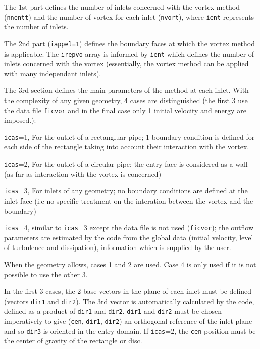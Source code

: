 {{{\begin{list}{-}{}
\item The 1st part defines the number of inlets concerned with the vortex
method (\texttt{nnentt}) and the number of vortex for each inlet
(\texttt{nvort}), where \texttt{ient} represents the number of inlets.
\item The 2nd part (\texttt{iappel=1}) defines the boundary faces at which the
      vortex method is applicable. The \texttt{irepvo} array is informed
      by \texttt{ient} which defines the number of inlets concerned with the vortex
(essentially, the vortex method can be applied with many independant inlets).
\item The 3rd section defines the main parameters of the method at each inlet.
      With the complexity of any given geometry, 4 cases are distinguished
      (the first 3 use the data file \texttt{ficvor} and in the final case only 1
      initial velocity and energy are imposed.):

\begin{list}{*}{}
\item \texttt{icas}=1, For the outlet of a rectangluar pipe; 1 boundary condition is defined
for each side of the rectangle taking into account their interaction
with the vortex.
\item \texttt{icas}=2, For the outlet of a circular pipe; the entry face is considered as a
 wall (as far as interaction with the vortex is concerned)
\item \texttt{icas}=3, For inlets of any geometry; no boundary conditions are defined at the
 inlet face (i.e no specific treatment on the interation between the
 vortex and the boundary)
\item \texttt{icas}=4, similar to \texttt{icas}=3 except the data file is not
 used (\texttt{ficvor}); the outflow
 parameters are estimated by the code from the global data (initial
 velocity, level of turbulence and dissipation), information which is
 supplied by the user.
\end{list}

When the geometry allows, cases 1 and 2 are used. Case 4 is only used
 if it is not possible to use the other 3.

In the first 3 cases, the 2 base vectors in the plane of each inlet
must be defined (vectors \texttt{dir1} and \texttt{dir2}). The 3rd vector is
automatically calculated by the code, defined as a product of \texttt{dir1} and
\texttt{dir2}. \texttt{dir1} and \texttt{dir2} must be chosen imperatively to
give (\texttt{cen}, \texttt{dir1}, \texttt{dir2}) an orthogonal reference of the
inlet plane and so \texttt{dir3} is oriented in the entry domain. If
\texttt{icas}=2, the \texttt{cen} position must be the center of gravity of the
rectangle or disc.


\end{list}}}}
